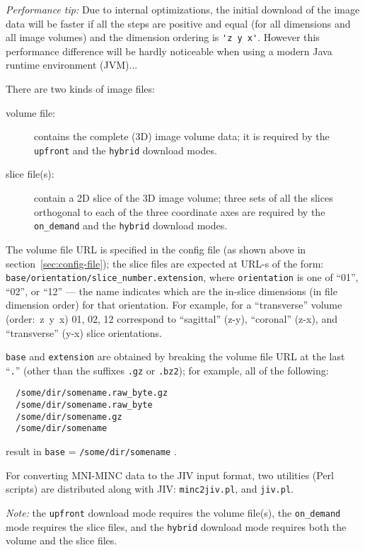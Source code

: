 \emph{Performance tip:} Due to internal optimizations, the initial
download of the image data will be faster if all the steps are
positive and equal (for all dimensions and all image volumes) and the
dimension ordering is \verb+'z y x'+.  However this performance
difference will be hardly noticeable when using a modern Java runtime
environment (JVM)...


There are two kinds of image files: 
\begin{description}
\item[volume file:] contains the complete (3D) image volume data; it
  is required by the \verb+upfront+ and the \verb+hybrid+ download
  modes.
\item[slice file(s):] contain a 2D slice of the 3D image volume; three
  sets of all the slices orthogonal to each of the three coordinate
  axes are required by the \verb+on_demand+ and the \verb+hybrid+
  download modes.
\end{description}
The volume file URL is specified in the config file (as shown above in
section~\ref{sec:config-file}); the slice files are expected at URL-s
of the form: \texttt{base/orientation/slice\_number.extension}, where
\texttt{orientation} is one of ``01'', ``02'', or ``12'' --- the name
indicates which are the in-slice dimensions (in file dimension order)
for that orientation. For example, for a ``transverse'' volume
(\mbox{order: z y x}) 01, 02, 12 correspond to ``sagittal'' (z-y),
``coronal'' (z-x), and ``transverse'' (y-x) slice orientations.

\texttt{base} and \texttt{extension} are obtained by breaking the
volume file URL at the last ``\verb+.+'' (other than the suffixes
\verb+.gz+ or \verb+.bz2+); for example, all of the following:
\begin{verbatim}
  /some/dir/somename.raw_byte.gz
  /some/dir/somename.raw_byte
  /some/dir/somename.gz
  /some/dir/somename
\end{verbatim}
result in \texttt{base} = \texttt{/some/dir/somename} .

For converting MNI-MINC data to the JIV input format, two utilities
(Perl scripts) are distributed along with JIV: \verb+minc2jiv.pl+, and
\verb+jiv.pl+.

\emph{Note:} the \verb+upfront+ download mode requires the volume
file(s), the \verb+on_demand+ mode requires the slice files, and the
\verb+hybrid+ download mode requires both the volume and the slice
files.


